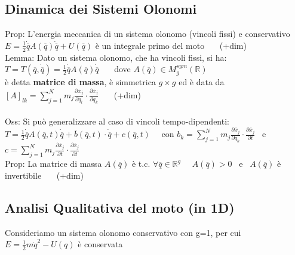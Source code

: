 \documentclass{article}
\theoremstyle{unnumbered}
\theoremstyle{unnumbered1}
\begin{document}
\subsection{Dinamica dei Sistemi Olonomi}
%
Prop: L'energia meccanica di un sistema olonomo (vincoli fissi) e conservativo \\ 
\phantom{Prop: }$E= \frac{1}{2}\dot{\overline{q}}A(\overline{q})\dot{\overline{q}}+U(\overline{q}) $ è un integrale primo del moto \ \ \ (+dim)\\
Lemma: Dato un sistema olonomo, che ha vincoli fissi, si ha: \ \ $T=T(\overline{q},\dot{\overline{q}})=\frac{1}{2}\dot{\overline{q}}A(\overline{q})\dot{\overline{q}}$ \ \ \ dove $A(\overline{q})\in M_g^{sym}(\mathbb{R})$ \\
\phantom{Lemma: }è detta \textbf{matrice di massa}, è simmetrica $g\times g$ ed è data da $\left[ A\right]_{lk}=\sum_{j=1}^N m_j\frac{\partial\overline{x}_j}{\partial q_l} \cdot\frac{\partial\overline{x}_j}{\partial q_k}$ \ \ \ (+dim)\\ \\
%
%
%
Oss: Si può generalizzare al caso di vincoli tempo-dipendenti: \\ 
\phantom{Oss: }$T=\frac{1}{2}\dot{\overline{q}}A(\overline{q},t)\dot{\overline{q}} +\overline{b}(\overline{q},t)\cdot\dot{\overline{q}} +c(\overline{q},t)$ \ \ con $b_k=\sum_{j=1}^N m_j\frac{\partial\overline{x}_j}{\partial q_k} \cdot\frac{\partial\overline{x}_j}{\partial t}$ \ e \ $c=\sum_{j=1}^N m_j\frac{\partial\overline{x}_j}{\partial t} \cdot\frac{\partial\overline{x}_j}{\partial t}$ \\
Prop: La matrice di massa $A(\overline{q})$ è t.c. $\forall\overline{q}\in\mathbb{R}^g$ \ \ $A(\overline{q})>0$ \ e \ $A(\overline{q})$ è invertibile \ \ \ (+dim)



\subsection{Analisi Qualitativa del moto (in 1D)}
%
Consideriamo un sistema olonomo conservativo con g=1, per cui $E=\frac{1}{2}m\dot{q}^2 -U(q)$  è conservata
\end{document}
